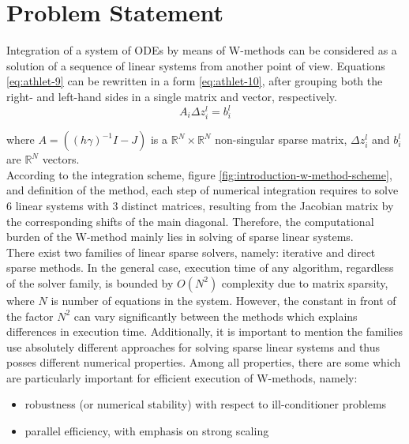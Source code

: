 \chapter{Problem Statement}\label{chapter:problem-statment}


Integration of a system of ODEs by means of W-methods can be considered as a solution of a sequence of linear systems from another point of view. Equations \ref{eq:athlet-9} can be rewritten in a form \ref{eq:athlet-10}, after grouping both the right- and left-hand sides in a single matrix and vector, respectively.\\


\begin{equation} \label{eq:athlet-10}
	A_{i} \Delta z^{l}_{i} =  b^{l}_{i} 
\end{equation}

where $A = ((h \gamma)^{-1}I - J)$ is a $\mathbb{R}^{N} \times \mathbb{R}^{N}$ non-singular sparse matrix, $\Delta z^{l}_{i}$  and $b^{l}_{i}$ are $\mathbb{R}^{N}$ vectors.\\


According to the integration scheme, figure \ref{fig:introduction-w-method-scheme}, and definition of the method, each step of numerical integration requires to solve 6 linear systems with 3 distinct matrices, resulting from the Jacobian matrix by the corresponding shifts of the main diagonal. Therefore, the computational burden of the W-method mainly lies in solving of sparse linear systems.\\


There exist two families of linear sparse solvers, namely: iterative and direct sparse methods. In the general case, execution time of any algorithm, regardless of the solver family, is bounded by $O(N^2)$ complexity due to matrix sparsity, where $N$ is number of equations in the system. However, the constant in front of the factor $N^2$ can vary significantly between the methods which explains differences in execution time. Additionally, it is important to mention the families use absolutely different approaches for solving sparse linear systems and thus posses different numerical properties. Among all  properties, there are some which are particularly important for efficient execution of W-methods, namely: \\


\begin{itemize}
	\item robustness (or numerical stability) with respect to ill-conditioner problems
	\item parallel efficiency, with emphasis on strong scaling 
\end{itemize}


